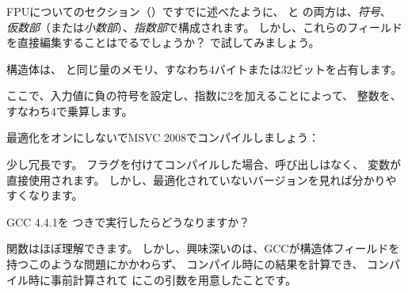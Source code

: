 ﻿\subsubsection{\WorkingWithFloatAsWithStructSubSubSectionName}
\label{sec:floatasstruct}

FPUについてのセクション（）ですでに述べたように、
\Tfloat と \Tdouble の両方は、\emph{符号}、
\emph{仮数部}（または\emph{小数部}）、\emph{指数部}で構成されます。 
しかし、これらのフィールドを直接編集することはでるでしょうか？ \Tfloat で試してみましょう。





構造体は、 \Tfloat と同じ量のメモリ、すなわち4バイトまたは32ビットを占有します。

ここで、入力値に負の符号を設定し、指数に2を加えることによって、
整数を、すなわち4で乗算します。

最適化をオンにしないでMSVC 2008でコンパイルしましょう：



少し冗長です。
\Ox フラグを付けてコンパイルした場合、呼び出しはなく、
変数が直接使用されます。 
しかし、最適化されていないバージョンを見れば分かりやすくなります。

GCC 4.4.1を \Othree つきで実行したらどうなりますか？



\ttf 関数はほぼ理解できます。 しかし、興味深いのは、GCCが構造体フィールドを持つこのような問題にかかわらず、
コンパイル時にの結果を計算でき、
コンパイル時に事前計算されて \printf にこの引数を用意したことです。
